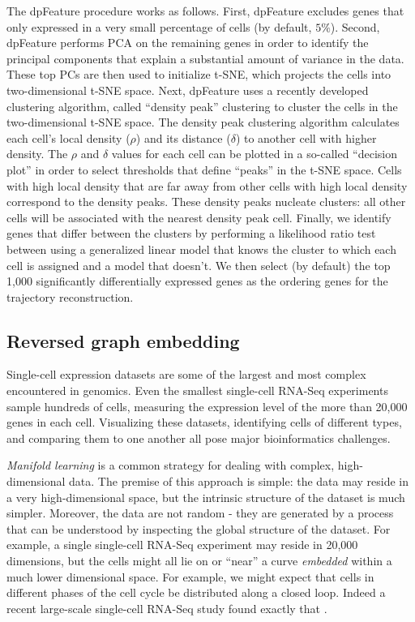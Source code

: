 \documentclass[10pt,oneside]{article}\usepackage[]{graphicx}\usepackage[]{color}
\begin{document}
The dpFeature procedure works as follows. First, dpFeature excludes genes that only expressed in a very small percentage of cells (by default, $5\%$). Second, dpFeature performs PCA on the remaining genes in order to identify the principal components that explain a substantial amount of variance in the data. These top PCs are then used to initialize t-SNE, which projects the cells into two-dimensional t-SNE space. Next, dpFeature uses a recently developed clustering algorithm, called ``density peak'' clustering \cite{Rodriguez2014-rl} to cluster the cells in the two-dimensional t-SNE space. The density peak clustering algorithm calculates each cell's local density ($\rho$) and its distance ($\delta$) to another cell with higher density. The $\rho$ and $\delta$ values for each cell can be plotted in a so-called ``decision plot'' in order to select thresholds that define ``peaks'' in the t-SNE space. Cells with high local density that are far away from other cells with high local density correspond to the density peaks. These density peaks nucleate clusters: all other cells will be associated with the nearest density peak cell. Finally, we identify genes that differ between the clusters by performing a likelihood ratio test between using a generalized linear model that knows the cluster to which each cell is assigned and a model that doesn't. We then select (by default) the top 1,000 significantly differentially expressed genes as the ordering genes for the trajectory reconstruction. 
	
\subsection{Reversed graph embedding}\label{RGE}
Single-cell expression datasets are some of the largest and most complex encountered
in genomics. Even the smallest single-cell RNA-Seq experiments sample hundreds of cells, measuring the
expression level of the more than 20,000 genes in each cell. Visualizing these
datasets, identifying cells of different types, and comparing them to one another
all pose major bioinformatics challenges. 

\emph{Manifold learning} is a common strategy for dealing with complex, high-dimensional
data. The premise of this approach is simple: the data may reside in a very high-dimensional space,
but the intrinsic structure of the dataset is much simpler. Moreover, the data 
are not random - they are generated by a process that can be understood by 
inspecting the global structure of the dataset. For example, a single single-cell RNA-Seq
experiment may reside in 20,000 dimensions, but the cells might all lie on or ``near'' 
a curve \emph{embedded} within a much lower dimensional space. For example, we 
might expect that cells in different phases of the cell cycle be distributed along
a closed loop. Indeed a recent large-scale single-cell RNA-Seq study found exactly
that \cite{Macosko2015-fh}.
\end{document}
